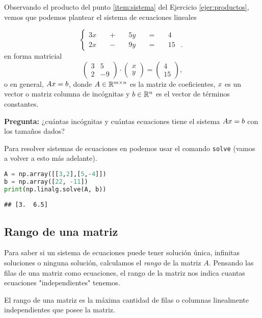 Observando el producto del punto \ref{item:sistema} del Ejercicio \ref{ejer:productos}, vemos que podemos plantear el sistema de ecuaciones lineales

$$
\left\{ {\begin{alignedat}{5}3x&&\;+\;&&5y&&\;=\;&&4&\\2x&&\;-\;&&9y&&\;=\;&&15&.\end{alignedat}} \right.
$$
en forma matricial
$$\begin{pmatrix}3&5\\ 2 & -9 \end{pmatrix} \cdot \begin{pmatrix}x\\ y \end{pmatrix} = \begin{pmatrix}4\\ 15 \end{pmatrix},$$
o en general, $\Ab \xb = \bb$, donde $\Ab \in \mathbb{R}^{m \times n}$ es la matriz de coeficientes, $\xb$ es un vector o matriz columna de incógnitas y $\bb \in \mathbb{R}^{n}$ es el vector de términos constantes.

\textbf{Pregunta:} ¿cuántas incógnitas y cuántas ecuaciones tiene el sistema $\Ab \xb = \bb$ con los tamaños dados?

Para resolver sistemas de ecuaciones en \python podemos usar el comando \texttt{solve} (vamos a volver a esto más adelante).

\begin{Shaded}
\begin{lstlisting}[language=Python]
A = np.array([[3,2],[5,-4]])
b = np.array([22, -11])
print(np.linalg.solve(A, b))
\end{lstlisting}
\end{Shaded}

\begin{verbatim}
## [3.  6.5]
\end{verbatim}

\subsection{Rango de una matriz}

Para saber si un sistema de ecuaciones puede tener solución única, infinitas soluciones o ninguna solución, calculamos el \emph{rango} de la matriz $A$. Pensando las filas de una matriz como ecuaciones, el rango de la matriz nos indica cuantas ecuaciones "independientes" tenemos.

El rango de una matriz es la máxima cantidad de filas o columnas linealmente independientes que posee la matriz.


